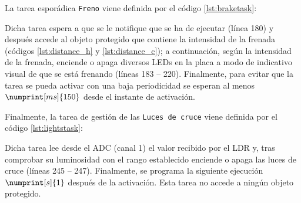 La tarea esporádica \texttt{Freno} viene definida por el código \ref{lst:braketask}:



Dicha tarea espera a que se le notifique que se ha de ejecutar (línea 180) y después accede
al objeto protegido que contiene la intensidad de la frenada (códigos \ref{lst:distance_h} y
\ref{lst:distance_c}); a continuación, según la intensidad de la frenada, enciende o
apaga diversos LEDs en la placa a modo de indicativo visual de que se está frenando
(líneas 183 -- 220). Finalmente, para evitar que la tarea se pueda activar con una
baja periodicidad se esperan al menos $\numprint[ms]{150}$ desde el instante de activación.

Finalmente, la tarea de gestión de las \texttt{Luces de cruce} viene definida por el código
\ref{lst:lightstask}:



Dicha tarea lee desde el ADC (canal 1) el valor recibido por el LDR y, tras comprobar
su luminosidad con el rango establecido enciende o apaga las luces de cruce (líneas 245 -- 247).
Finalmente, se programa la siguiente ejecución $\numprint[s]{1}$ después de la
activación. Esta tarea no accede a ningún objeto protegido.
